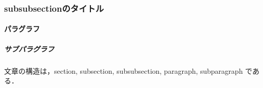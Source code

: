 \documentclass[twocolumn]{jarticle} %
\begin{document}
\subsubsection{subsubsectionのタイトル}

\paragraph{パラグラフ}

\subparagraph{サブパラグラフ}

文章の構造は，section, subsection, subsubsection, paragraph, subparagraph である．







\end{document}
